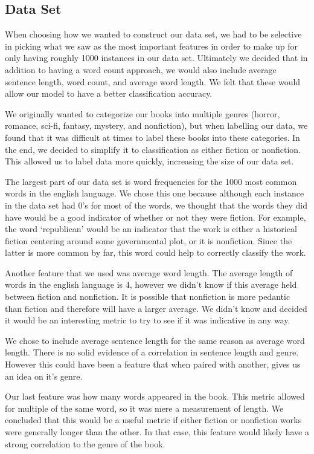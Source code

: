 \documentclass{article}
\begin{document}
\subsection{Data Set}
When choosing how we wanted to construct our data set, we had to be selective in picking what we saw as the most important features in order to make up for only having roughly 1000 instances in our data set. Ultimately we decided that in addition to having a word count approach, we would also include average sentence length, word count, and average word length. We felt that these would allow our model to have a better classification accuracy.\par
We originally wanted to categorize our books into multiple genres (horror, romance, sci-fi, fantasy, mystery, and nonfiction), but when labelling our data, we found that it was difficult at times to label these books into these categories. In the end, we decided to simplify it to classification as either fiction or nonfiction. This allowed us to label data more quickly, increasing the size of our data set.\par
The largest part of our data set is word frequencies for the 1000 most common words in the english language. We chose this one because although each instance in the data set had 0’s for most of the words, we thought that the words they did have would be a good indicator of whether or not they were fiction. For example, the word ‘republican’ would be an indicator that the work is either a historical fiction centering around some governmental plot, or it is nonfiction. Since the latter is more common by far, this word could help to correctly classify the work.\par
Another feature that we used was average word length. The average length of words in the english language is 4, however we didn’t know if this average held between fiction and nonfiction. It is possible that nonfiction is more pedantic than fiction and therefore will have a larger average. We didn’t know and decided it would be an interesting metric to try to see if it was indicative in any way.\par
We chose to include average sentence length for the same reason as average word length. There is no solid evidence of a correlation in sentence length and genre. However this could have been a feature that when paired with another, gives us an idea on it’s genre. \par
Our last feature was how many words appeared in the book. This metric allowed for multiple of the same word, so it was mere a measurement of length. We concluded that this would be a useful metric if either fiction or nonfiction works were generally longer than the other. In that case, this feature would likely have a strong correlation to the genre of the book.
\end{document}
